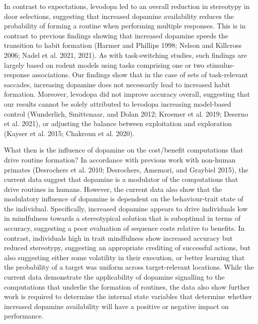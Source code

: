 \documentclass{article}
\begin{document}
In contrast to expectations, levodopa led to an overall reduction in
stereotypy in door selections, suggesting that increased dopamine
availability reduces the probability of forming a routine when
performing multiple responses. This is in contrast to previous findings
showing that increased dopamine speeds the transition to habit formation
(Harmer and Phillips 1998; Nelson and Killcross 2006; Nadel et al. 2021,
2021). As with task-switching studies, such findings are largely based
on rodent models using tasks comprising one or two stimulus-response
associations. Our findings show that in the case of sets of
task-relevant saccades, increasing dopamine does not necessarily lead to
increased habit formation. Moreover, levodopa did not improve accuracy
overall, suggesting that our results cannot be solely attributed to
levodopa increasing model-based control (Wunderlich, Smittenaar, and
Dolan 2012; Kroemer et al. 2019; Deserno et al. 2021), or adjusting the
balance between exploitation and exploration (Kayser et al. 2015;
Chakroun et al. 2020).

What then is the influence of dopamine on the cost/benefit computations
that drive routine formation? In accordance with previous work with
non-human primates (Desrochers et al. 2010; Desrochers, Amemori, and
Graybiel 2015), the current data suggest that dopamine is a modulator of
the computations that drive routines in humans. However, the current
data also show that the modulatory influence of dopamine is dependent on
the behaviour-trait state of the individual. Specifically, increased
dopamine appears to drive individuals low in mindfulness towards a
stereotypical solution that is suboptimal in terms of accuracy,
suggesting a poor evaluation of sequence costs relative to benefits. In
contrast, individuals high in trait mindfulness show increased accuracy
but reduced stereotypy, suggesting an appropriate crediting of
successful actions, but also suggesting either some volatility in their
execution, or better learning that the probability of a target was
uniform across target-relevant locations. While the current data
demonstrate the applicability of dopamine signalling to the computations
that underlie the formation of routines, the data also show further work
is required to determine the internal state variables that determine
whether increased dopamine availability will have a positive or negative
impact on performance.
\end{document}
